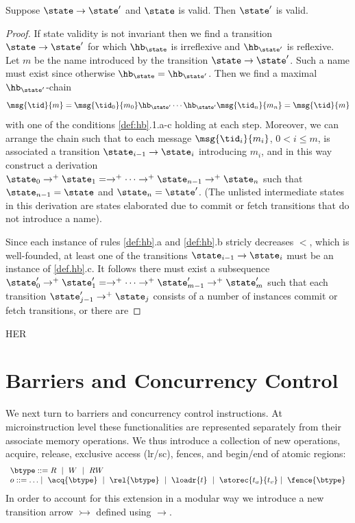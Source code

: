 \begin{theorem}
Suppose $\state\rightarrow \state'$ and $\state$ is valid. Then $\state'$ is valid.
\end{theorem}
\begin{proof}
If state validity is not invariant then we find a transition
$\state\rightarrow \state'$ for which $\hb_{\state}$ is irreflexive and
$\hb_{\state'}$ is reflexive. Let $m$ be the name introduced by the transition
$\state\rightarrow \state'$. Such a name must exist since otherwise
$\hb_\state=\hb_{\state'}$. Then we find a maximal $\hb_{\state'}$-chain
\[
\msg{\tid}{m} = \msg{\tid_0}{m_0}\hb_{\state'}\cdots \hb_{\state'}\msg{\tid_n}{m_n} = \msg{\tid}{m}
\]
with one of the conditions \ref{def:hb}.1.a-c holding at each step. Moreover, we can arrange the chain such that to each message $\msg{\tid_i}{m_i}$, $0 < i \leq m$, is associated a transition $\state_{i-1}\rightarrow \state_i$ introducing $m_i$, and in this way construct a derivation $\state_0\rightarrow^+
\state_1 =\rightarrow^+ \cdots \rightarrow^+ \state_{n-1} \rightarrow^+ \state_n$
such that $\state_{n-1} = \state$ and $\state_n = \state'$. (The unlisted intermediate states in this derivation are states elaborated due to commit or fetch transitions that do not introduce a name).

Since each instance of rules \ref{def:hb}.a and \ref{def:hb}.b stricly decreases $<$, which is well-founded, at least one of the transitions $\state_{i-1}\rightarrow \state_i$ must be an instance of \ref{def.hb}.c. It follows there must exist a subsequence $\state_0'\rightarrow^+
\state_1' =\rightarrow^+ \cdots \rightarrow^+ \state_{m-1}' \rightarrow^+ \state_m'$ such that each transition $\state_{j-1}'\rightarrow^+ \state_{j}$ consists of a number of instances commit or fetch transitions, or there are  

\end{proof}
%
HER

%
\section{Barriers and Concurrency Control}
%
We next turn to barriers and concurrency control instructions.
At microinstruction level these functionalities are represented separately from their associate memory operations. 
We thus introduce a collection of new operations, acquire, release, exclusive access (lr/sc), fences, and begin/end of atomic regions:
\[
\begin{array}{l}
\btype ::= R\ \mid\ W\ \mid\ RW \\
o ::= \ldots \mid\ \acq{\btype}\ \mid\ \rel{\btype}\ \mid\ \loadr{t}\ \mid\ \storec{t_a}{t_v}\mid\ \fence{\btype}
\end{array}
\]
In order to account for this extension in a modular way we introduce a
new transition arrow  $\rightarrowtail$ defined using $\rightarrow$.

